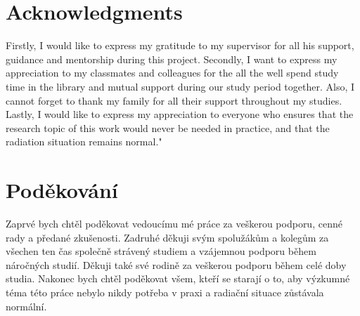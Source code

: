 
\section*{Acknowledgments}

Firstly, I would like to express my gratitude to my supervisor for all his support, guidance and mentorship during this project.
Secondly, I want to express my appreciation to my classmates and colleagues for the all the well spend study time in the library and mutual support during our study period together.
Also, I cannot forget to thank my family for all their support throughout my studies.
Lastly, I would like to express my appreciation to everyone who ensures that the research topic of this work would never be needed in practice, and that the radiation situation remains normal."
\vspace{2.5cm}








\section*{Poděkování}


Zaprvé bych chtěl poděkovat vedoucímu mé práce za veškerou podporu, cenné rady a předané zkušenosti.
Zadruhé děkuji svým spolužákům a kolegům za všechen ten čas společně strávený studiem a vzájemnou podporu během náročných studií.
Děkuji také své rodině za veškerou podporu během celé doby studia.
Nakonec bych chtěl poděkovat všem, kteří se starají o to, aby výzkumné téma této práce nebylo nikdy potřeba v praxi a radiační situace zůstávala normální. 
